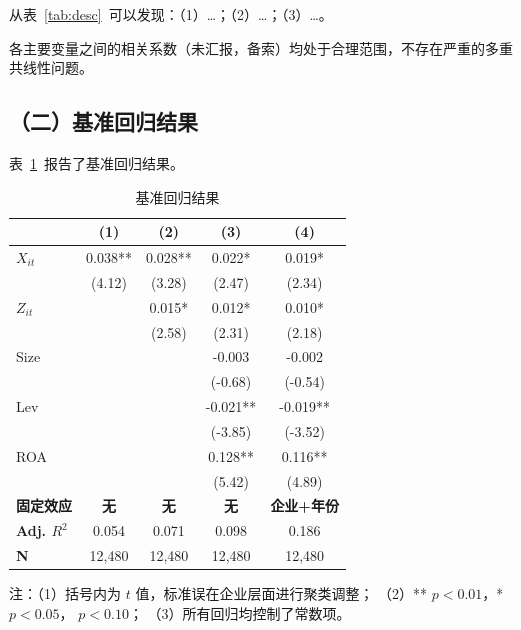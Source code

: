 \documentclass[lang=cn, aaffiliation={中国}]{ctexart}
\begin{document}
从表~\ref{tab:desc}~可以发现：（1）\dots；（2）\dots；（3）\dots。

各主要变量之间的相关系数（未汇报，备索）均处于合理范围，不存在严重的多重共线性问题。

\subsection{（二）基准回归结果}
\label{sec:baseline}

表~\ref{tab:regression}~报告了基准回归结果。

\begin{table}[htbp]
    \centering
    \caption{基准回归结果}
    \label{tab:regression}
    \begin{threeparttable}
        \begin{tabular}{lcccc}
            \toprule
            \textbf{} & \textbf{(1)} & \textbf{(2)} & \textbf{(3)} & \textbf{(4)} \\
            \midrule
            $X_{it}$ & 0.038\*** & 0.028\*** & 0.022\** & 0.019\** \\
              & (4.12) & (3.28) & (2.47) & (2.34) \\
            $Z_{it}$ & & 0.015\** & 0.012\** & 0.010\** \\
              & & (2.58) & (2.31) & (2.18) \\
            \midrule
            Size & & & -0.003 & -0.002 \\
              & & & (-0.68) & (-0.54) \\
            Lev & & & -0.021\*** & -0.019\*** \\
              & & & (-3.85) & (-3.52) \\
            ROA & & & 0.128\*** & 0.116\*** \\
              & & & (5.42) & (4.89) \\
            \midrule
            \textbf{固定效应} & \textbf{无} & \textbf{无} & \textbf{无} & \textbf{企业+年份} \\
            \textbf{Adj. $R^2$} & 0.054 & 0.071 & 0.098 & 0.186 \\
            \textbf{N} & 12,480 & 12,480 & 12,480 & 12,480 \\
            \bottomrule
        \end{tabular}
        \begin{tablenotes}\footnotesize
            \item 注：（1）括号内为 $t$ 值，标准误在企业层面进行聚类调整；
            （2）\*** $p<0.01$，\** $p<0.05$，\* $p<0.10$；
            （3）所有回归均控制了常数项。
        \end{tablenotes}
    \end{threeparttable}
\end{table}
\end{document}

